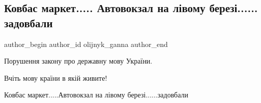  
 
 
 
 
 
\subsection{Ковбас маркет..... Автовокзал на лівому березі...... задовбали}
\label{sec:19_05_2021.fb.olijnyk_ganna.1.zakon_kovbas_market}
 
\ifcmt
 author_begin
   author_id olijnyk_ganna
 author_end
\fi

Порушення закону  про державну мову України.

Вчіть мову країни в якій живите!

Ковбас маркет.....Автовокзал на лівому березі......задовбали

